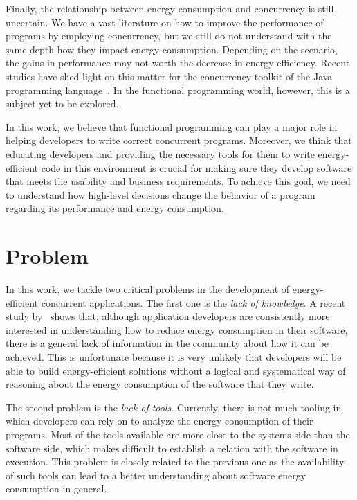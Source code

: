 Finally, the relationship between energy consumption and concurrency is still uncertain. We have a vast literature on how to improve the performance of programs by employing concurrency, but we still do not understand with the same depth how they impact energy consumption. Depending on the scenario, the gains in performance may not worth the decrease in energy efficiency. Recent studies have shed light on this matter for the concurrency toolkit of the Java programming language~\cite{pinto:2014,pinto:2016}. In the functional programming world, however, this is a subject yet to be explored.

In this work, we believe that functional programming can play a major role in helping developers to write correct concurrent programs. Moreover, we think that educating developers and providing the necessary tools for them to write energy-efficient code in this environment is crucial for making sure they develop software that meets the usability and business requirements. To achieve this goal, we need to understand how high-level decisions change the behavior of a program regarding its performance and energy consumption.


\section{Problem}
In this work, we tackle two critical problems in the development of energy-efficient concurrent applications. The first one is the \emph{lack of knowledge}. A recent study by~ shows that, although application developers are consistently more interested in understanding how to reduce energy consumption in their software, there is a general lack of information in the community about how it can be achieved. This is unfortunate because it is very unlikely that developers will be able to build energy-efficient solutions without a logical and systematical way of reasoning about the energy consumption of the software that they write.

The second problem is the \emph{lack of tools}. Currently, there is not much tooling in which developers can rely on to analyze the energy consumption of their programs. Most of the tools available are more close to the systems side than the software side, which makes difficult to establish a relation with the software in execution. This problem is closely related to the previous one as the availability of such tools can lead to a better understanding about software energy consumption in general.



